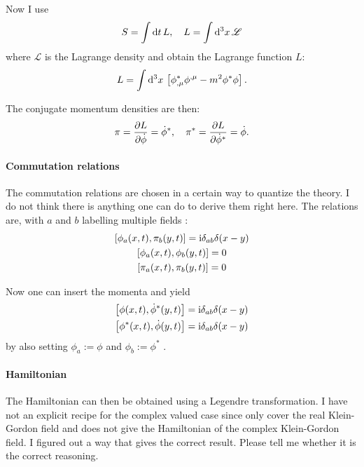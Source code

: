 \documentclass[11pt, english, fleqn, DIV=15, headinclude, BCOR=1cm]{scrartcl}
\begin{document}
Now I use
\[
    S = \int \mathop{}\!\mathrm d t \, L
    ,\quad
    L = \int \mathop{}\!\mathrm d^3 x \, \mathscr L
\]
where $\mathscr L$ is the Lagrange density and obtain the Lagrange function
$L$:
\[
    L = \int \mathop{}\!\mathrm d^3 x \, \left[ 
        \phi^*_{,\mu} \phi^{,\mu} - m^2 \phi^* \phi
     \right].
\]

The conjugate momentum densities are then:
\[
    \pi = \frac{\partial {L}}{\partial {\dot \phi}} = \dot \phi^{*}
    ,\quad
    \pi^* = \frac{\partial {L}}{\partial {\dot \phi^*}} = \dot \phi.
\]

\paragraph{Commutation relations}

The commutation relations are chosen in a certain way to quantize the theory. I
do not think there is anything one can do to derive them right here. The
relations are, with $a$ and $b$ labelling multiple fields
\parencite[(12.3.1)]{Schwabl/Quantenmechanik_fuer_Fortgeschrittene/2008}:
\begin{gather*}
    \left[ \phi_a(x, t), \pi_b(y, t) \right] = \mathrm i \delta_{ab} \delta(x - y) \\
    \left[ \phi_a(x, t), \phi_b(y, t) \right] = 0 \\
    \left[ \pi_a(x, t), \pi_b(y, t) \right] = 0
\end{gather*}

Now one can insert the momenta and yield
\begin{gather*}
    \left[ \phi(x, t), \dot\phi^*(y, t) \right] = \mathrm i \delta_{ab} \delta(x - y) \\
    \left[ \phi^*(x, t), \dot\phi(y, t) \right] = \mathrm i \delta_{ab} \delta(x - y)
\end{gather*}
by also setting $\phi_a := \phi$ and $\phi_b := \phi^*$
\parencite[(13.2.4)]{Schwabl/Quantenmechanik_fuer_Fortgeschrittene/2008}.

\paragraph{Hamiltonian}

The Hamiltonian can then be obtained using a Legendre transformation. I have
not an explicit recipe for the complex valued case since
\textcite[Chapter~2]{Peskin/QFT/1995} only cover the real Klein-Gordon field
and \textcite[Chapter~13.2]{Schwabl/Quantenmechanik_fuer_Fortgeschrittene/2008}
does not give the Hamiltonian of the complex Klein-Gordon field. I figured out
a way that gives the correct result. Please tell me whether it is the correct
reasoning.
\end{document}
